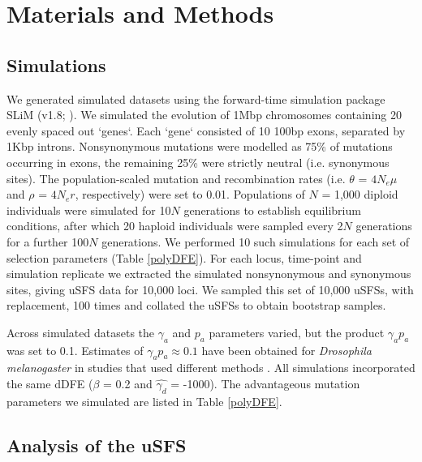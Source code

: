 \documentclass[11pt]{article}
\begin{document}
%
%
\section*{Materials and Methods}


	\subsection*{Simulations}
	
	We generated simulated datasets using the forward-time simulation package SLiM (v1.8; \citealt{RN148}). We simulated the evolution of 1Mbp chromosomes containing 20 evenly spaced out `genes`. Each `gene` consisted of 10 100bp exons, separated by 1Kbp introns. Nonsynonymous mutations were modelled as 75\% of mutations occurring in exons, the remaining 25\% were strictly neutral (i.e. synonymous sites). The population-scaled mutation and recombination rates (i.e. $\theta$ = \emph{$4N_{e}\mu$} and $\rho$ = \emph{$4N_{e}r$}, respectively) were set to 0.01. Populations of $N$ = 1,000 diploid individuals were simulated for 10$N$ generations to establish equilibrium conditions, after which 20 haploid individuals were sampled every 2$N$ generations for a further 100$N$ generations. We performed 10 such simulations for each set of selection parameters (Table \ref{polyDFE}). For each locus, time-point and simulation replicate we extracted the simulated nonsynonymous and synonymous sites, giving uSFS data for 10,000 loci. We sampled this set of 10,000 uSFSs, with replacement, 100 times and collated the uSFSs to obtain bootstrap samples.

	Across simulated datasets the $\gamma_a$ and $p_a$ parameters varied, but the product $\gamma_a p_a$ was set to 0.1. Estimates of $\gamma_a p_a \approx 0.1$ have been obtained for \textit{Drosophila melanogaster} in studies that used different methods \citep{RN323,RN321}. All simulations incorporated the same dDFE ($\beta$ = 0.2 and $\hat{\gamma_d}$ = -1000). The advantageous mutation parameters we simulated are listed in Table \ref{polyDFE}.


	\subsection*{Analysis of the uSFS}
\end{document}
